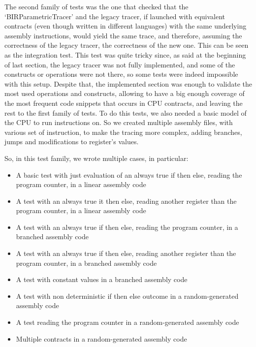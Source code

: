 The second family of tests was the one that checked that the `BIRParametricTracer'
and the legacy tracer, if launched with equivalent contracts (even though
written in different languages) with the same underlying assembly instructions,
would yield the same trace, and therefore, assuming the correctness of the
legacy tracer, the correctness of the new one. This can be seen as the
integration test. This test was quite tricky since, as said at the beginning of
last section, the legacy tracer was not fully implemented, and some of the
constructs or operations were not there, so some tests were indeed impossible with
this setup. Despite that, the implemented section was enough to validate the most
used operations and constructs, allowing to have a big enough coverage of the
most frequent code snippets that occurs in CPU contracts, and leaving the rest to
the first family of tests. To do this tests, we also needed a basic model of the
CPU to run instructions on. So we created multiple assembly files, with various set
of instruction, to make the tracing more complex, adding branches, jumps and
modifications to register's values.

So, in this test family, we wrote multiple cases, in particular:
\begin{itemize}
  \item A basic test with just evaluation of an always true if then else,
    reading the program counter, in a linear assembly code

  \item A test with an always true it then else, reading another register than
    the program counter, in a linear assembly code

  \item A test with an always true if then else, reading the program counter, in
    a branched assembly code

  \item A test with an always true if then else, reading another register than
    the program counter, in a branched assembly code

  \item A test with constant values in a branched assembly code

  \item A test with non deterministic if then else outcome in a random-generated
    assembly code

  \item A test reading the program counter in a random-generated assembly code

  \item Multiple contracts in a random-generated assembly code
\end{itemize}

